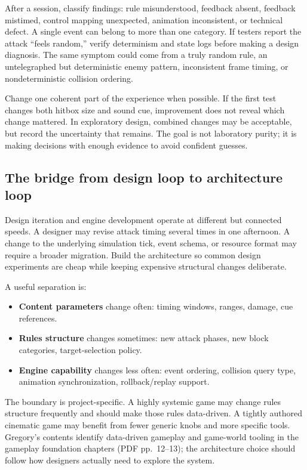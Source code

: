 After a session, classify findings: rule misunderstood, feedback absent, feedback mistimed, control mapping unexpected, animation inconsistent, or technical defect. A single event can belong to more than one category. If testers report the attack ``feels random,'' verify determinism and state logs before making a design diagnosis. The same symptom could come from a truly random rule, an untelegraphed but deterministic enemy pattern, inconsistent frame timing, or nondeterministic collision ordering.

Change one coherent part of the experience when possible. If the first test changes both hitbox size and sound cue, improvement does not reveal which change mattered. In exploratory design, combined changes may be acceptable, but record the uncertainty that remains. The goal is not laboratory purity; it is making decisions with enough evidence to avoid confident guesses.

\subsection{The bridge from design loop to architecture loop}\label{06-engine-ii-ch041-the-bridge-from-design-loop-to-architecture-loop}

\hypertarget{06-engine-ii-ch041-the-bridge-from-design-loop-to-architecture-loop}{}

Design iteration and engine development operate at different but connected speeds. A designer may revise attack timing several times in one afternoon. A change to the underlying simulation tick, event schema, or resource format may require a broader migration. Build the architecture so common design experiments are cheap while keeping expensive structural changes deliberate.

A useful separation is:

\begin{itemize}
\tightlist
\item
  \textbf{Content parameters} change often: timing windows, ranges, damage, cue references.
\item
  \textbf{Rules structure} changes sometimes: new attack phases, new block categories, target-selection policy.
\item
  \textbf{Engine capability} changes less often: event ordering, collision query type, animation synchronization, rollback/replay support.
\end{itemize}

The boundary is project-specific. A highly systemic game may change rules structure frequently and should make those rules data-driven. A tightly authored cinematic game may benefit from fewer generic knobs and more specific tools. Gregory's contents identify data-driven gameplay and game-world tooling in the gameplay foundation chapters (PDF pp.~12--13); the architecture choice should follow how designers actually need to explore the system.


